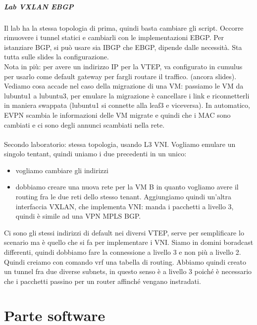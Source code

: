 \documentclass[12pt, oneside]{extbook} %
\begin{document}
\subsubsection{Lab VXLAN EBGP}
Il lab ha la stessa topologia di prima, quindi basta cambiare gli script. Occorre rimuovere i tunnel statici e cambiarli con le implementazioni EBGP. Per istanziare BGP, si può usare sia IBGP che EBGP, dipende dalle necessità. Sta tutta sulle slides la configurazione.
\\Nota in più: per avere un indirizzo IP per la VTEP, va configurato in cumulus per usarlo come default gateway per fargli routare il traffico. (ancora slides).\\Vediamo cosa accade nel caso della migrazione di una VM: passiamo le VM da lubuntu1 a lubuntu3, per emulare la migrazione è cancellare i link e riconnetterli in maniera swappata (lubuntu1 si connette alla leaf3 e viceversa). In automatico, EVPN scambia le informazioni delle VM migrate e quindi che i MAC sono cambiati e ci sono degli annunci scambiati nella rete.\\\\Secondo laboratorio: stessa topologia, usando L3 VNI. Vogliamo emulare un singolo tentant, quindi uniamo i due precedenti in un unico:
\begin{itemize}
\item vogliamo cambiare gli indirizzi
\item dobbiamo creare una nuova rete per la VM B in quanto vogliamo avere il routing fra le due reti dello stesso tenant. Aggiungiamo quindi un'altra interfaccia VXLAN, che implementa VNI: manda i pacchetti a livello 3, quindi è simile ad una VPN MPLS BGP.
\end{itemize}
Ci sono gli stessi indirizzi di default nei diversi VTEP, serve per semplificare lo scenario ma è quello che si fa per implementare i VNI. Siamo in domini boradcast differenti, quindi dobbiamo fare la connessione a livello 3 e non più a livello 2. Quindi creiamo con comando vrf una tabella di routing. Abbiamo quindi creato un tunnel fra due diverse subnets, in questo senso è a livello 3 poiché è necessario che i pacchetti passino per un router affinché vengano instradati.





\newpage
\part{Parte software}
\end{document}
